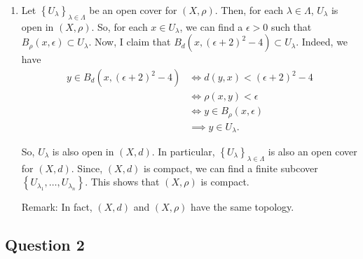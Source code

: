 \documentclass{article}
\begin{document}
\begin{enumerate}[label=\roman*)]
\item Let $\left\{U_{\lambda}\right\}_{\lambda\in \Lambda}$ be an open cover for $(X,\rho)$. 
Then, for each $\lambda \in \Lambda$, $U_\lambda$ is open in $(X,\rho)$. 
So, for each $x\in U_\lambda$, we can find a $\epsilon > 0$ such that 
$B_\rho(x,\epsilon) \subset U_\lambda$. Now, I claim that $B_d\left(x,(\epsilon+2)^2-4\right) \subset 
U_\lambda$. Indeed, we have 
\begin{align*}
    y\in B_d\left(x,(\epsilon+2)^2-4\right)
&\iff 
d(y,x)<(\epsilon+2)^2-4\\
&\iff 
\rho(x,y)<\epsilon\\
&\iff 
y\in B_\rho(x,\epsilon)\\
&\implies y\in U_\lambda.
\end{align*}

So, $U_\lambda$ is also open in $(X,d)$. In particular, 
$\left\{U_{\lambda}\right\}_{\lambda\in \Lambda}$ is also an open cover for 
$(X,d)$. Since, $(X,d)$ is compact, we can find a finite subcover 
$\left\{U_{\lambda_1},\dots,U_{\lambda_n}\right\}$. This shows that $(X,\rho)$ is compact. 

Remark: In fact, $(X,d)$ and $(X,\rho)$ have the same topology.

\end{enumerate}

\subsection*{Question 2}
\end{document}
